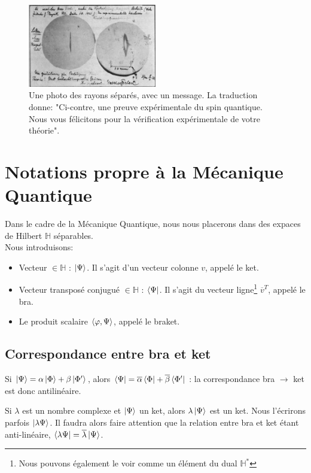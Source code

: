 \documentclass[../notesdecours.tex]{subfiles}
\begin{document}
\begin{center}
\begin{figure}[h]
\centering
\includegraphics[width=0.50\textwidth]{exp.png}
\caption{Une photo des rayons séparés, avec un message. La traduction donne: "Ci-contre, une preuve expérimentale du spin quantique. Nous vous félicitons pour la vérification expérimentale de votre théorie".}
\end{figure}
\end{center}
\newpage

\section{Notations propre à la Mécanique Quantique}
Dans le cadre de la Mécanique Quantique, nous nous placerons dans des expaces de Hilbert $\mathbb{H}$ séparables.\\

Nous introduisons:
\begin{itemize}
\item Vecteur $\in \mathbb{H}$ : $\ket{\Psi}$. Il s'agit d'un vecteur colonne $v$, appelé le ket.
\item Vecteur transposé conjugué $\in \mathbb{H}$ : $\bra{\Psi}$. Il s'agit du vecteur ligne\footnote{Nous pouvons également le voir comme un élément du dual $\mathbb{H}^*$} $\overline{v}^T$, appelé le bra.
\item Le produit scalaire $\braket{\varphi,\Psi}$, appelé le braket.
\end{itemize}
\subsection{Correspondance entre bra et ket}
Si $\ket{\Psi} = \alpha \ket{\Phi} + \beta\ket{\Phi'}$, alors $\bra{\Psi} = \overline{\alpha}\bra{\Phi}+\overline{\beta}\bra{\Phi'}$ : la correspondance bra $\rightarrow$ ket est donc antilinéaire. 
\begin{remark} Si $\lambda$ est un nombre complexe et $\ket{\Psi}$ un ket, alors $\lambda\ket{\Psi}$ est un ket. Nous l'écrirons parfois $\ket{\lambda\Psi}$. Il faudra alors faire attention que la relation entre bra et ket étant anti-linéaire, $\bra{\lambda\Psi} = \overline{\lambda}\ket{\Psi}$. \end{remark}
\end{document}
